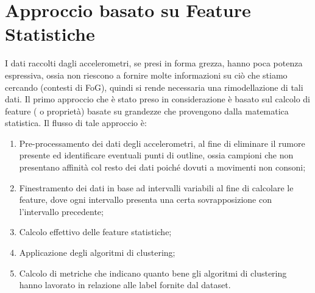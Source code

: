 \section{Approccio basato su Feature Statistiche}
I dati raccolti dagli accelerometri, se presi in forma grezza, hanno poca potenza espressiva, ossia non riescono a fornire molte informazioni su ciò che stiamo cercando (contesti di FoG), quindi si rende necessaria una rimodellazione di tali dati. Il primo approccio che è stato preso in considerazione è basato sul calcolo di feature ( o proprietà) basate su grandezze che provengono dalla matematica statistica. Il flusso di tale approccio è:
\begin{enumerate}
	\item Pre-processamento dei dati degli accelerometri, al fine di eliminare il rumore presente ed identificare eventuali punti di outline, ossia campioni che non presentano affinità col resto dei dati poiché dovuti a movimenti non consoni;
	\item Finestramento dei dati in base ad intervalli variabili al fine di calcolare le feature, dove ogni intervallo presenta una certa sovrapposizione con l'intervallo precedente;
	\item Calcolo effettivo delle feature statistiche;
	\item Applicazione degli algoritmi di clustering;
	\item Calcolo di metriche che indicano quanto bene gli algoritmi di clustering hanno lavorato in relazione alle label fornite dal dataset.
\end{enumerate}
